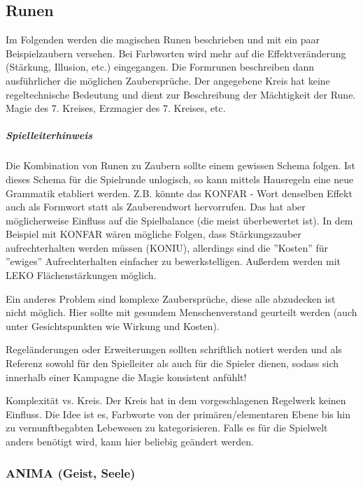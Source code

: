 \documentclass{article}
\begin{document}
\begin{center}
\subsection{Runen}
\end{center}

Im Folgenden werden die magischen Runen beschrieben und mit ein paar Beispielzaubern versehen. Bei Farbworten wird
mehr auf die Effektveränderung (Stärkung, Illusion, etc.) eingegangen. Die Formrunen beschreiben dann ausführlicher
die möglichen Zaubersprüche. Der angegebene Kreis hat keine regeltechnische Bedeutung und dient zur Beschreibung der
Mächtigkeit der Rune. Magie des 7. Kreises, Erzmagier des 7. Kreises, etc.

\begin{mdframed}[hidealllines=true, backgroundcolor=black!10]
\subparagraph{Spielleiterhinweis}

Die Kombination von Runen zu Zaubern sollte einem gewissen Schema folgen. Ist dieses Schema für die Spielrunde
unlogisch, so kann mittels Hausregeln eine neue Grammatik etabliert werden. Z.B. könnte das KONFAR - Wort denselben
Effekt auch als Formwort statt als Zauberendwort hervorrufen. Das hat aber möglicherweise Einfluss auf die
Spielbalance (die meist überbewertet ist). In dem Beispiel mit KONFAR wären mögliche Folgen, dass Stärkungszauber
aufrechterhalten werden müssen (KONIU), allerdings sind die ''Kosten'' für ''ewiges'' Aufrechterhalten einfacher zu
bewerkstelligen. Außerdem werden mit LEKO Flächenstärkungen möglich.

Ein anderes Problem sind komplexe Zaubersprüche, diese alle abzudecken ist nicht möglich. Hier sollte mit gesundem
Menschenverstand geurteilt werden (auch unter Gesichtspunkten wie Wirkung und Kosten).

Regeländerungen oder Erweiterungen sollten schriftlich notiert werden und als Referenz sowohl für den Spielleiter als
auch für die Spieler dienen, sodass sich innerhalb einer Kampagne die Magie konsistent anfühlt!

Komplexität vs. Kreis. Der Kreis hat in dem vorgeschlagenen Regelwerk keinen Einfluss. Die Idee ist es, Farbworte von
der primären/elementaren Ebene bis hin zu vernunftbegabten Lebewesen zu kategorisieren. Falls es für die Spielwelt
anders benötigt wird, kann hier beliebig geändert werden.

\end{mdframed}
\subsubsection{ANIMA (Geist, Seele)}
\end{document}
